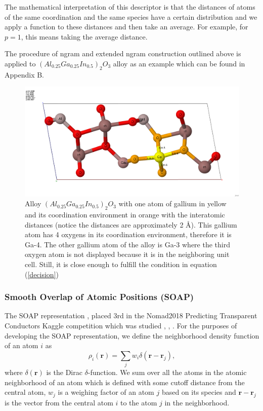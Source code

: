 \documentclass[11pt,oneside,czech,american]{book} %
\theoremstyle{definition} %
\theoremstyle{definition}
\begin{document}
The mathematical interpretation of this descriptor is that the distances of atoms of the same coordination and the same species have a certain distribution and we apply a function to these distances and then take an average. For example, for $p=1$, this means taking the average distance.

The procedure of ngram and extended ngram construction outlined above is applied to $(Al_{0.25}Ga_{0.25}In_{0.5})_2 O_3$ alloy as an example which can be found in Appendix B.
\begin{figure}[H]
	\centering
	\includegraphics[scale=0.23]{train_id_20_final_Ga4_hotovo.png}
	\caption{Alloy $(Al_{0.25}Ga_{0.25}In_{0.5})_2 O_3$ with one atom of gallium in yellow and its coordination environment in orange with the interatomic distances (notice the distances are approximately 2 $\text{\AA}$). This gallium atom has 4 oxygens in its coordination environment, therefore it is Ga-4. The other gallium atom of the alloy is Ga-3 where the third oxygen atom is not displayed because it is in the neighboring unit cell. Still, it is close enough to fulfill the condition in equation (\ref{decision}) \parencite{jmol}}
\end{figure}

\subsubsection{Smooth Overlap of Atomic Positions (SOAP)}
The SOAP representation \parencite{bartok13}, \parencite{bartok15} placed 3rd in the Nomad2018 Predicting Transparent Conductors Kaggle competition which was studied \parencite{sutton18}, \parencite{sutton19}, \parencite{kaggle_web}. For the purposes of developing the SOAP representation, we define the neighborhood density function of an atom $i$ as
\begin{equation}
	\rho_i (\bm{r}) = \sum_{j} w_{i} \delta(\bm{r}-\bm{r}_j),
\end{equation}
where $\delta(\bm{r})$ is the Dirac $\delta$-function. We sum over all the atoms in the atomic neighborhood of an atom which is defined with some cutoff distance from the central atom, $w_{j}$ is a weighing factor of an atom $j$ based on its species and $\bm{r} - \bm{r}_j$ is the vector from the central atom $i$ to the atom $j$ in the neighborhood.
\end{document}
